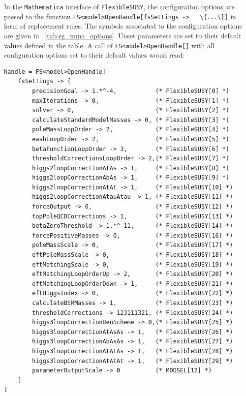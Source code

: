 \documentclass[final,3p,11pt,pdflatex]{elsarticle}
\makeatletter
\newcommand{\fs}{\texttt{FlexibleSUSY}\@\xspace}
\newcommand{\mathematica}{\texttt{Ma\-the\-ma\-ti\-ca}\xspace}
\newcommand{\code}[1]{\lstinline|#1|}  %
\newcommand{\tabref}[1]{\tablename~\ref{#1}}
\makeatother
\begin{document}
%
In the \mathematica interface of \fs, the configuration options are
passed to the function \code{FS<model>OpenHandle[fsSettings ->
  \{...\}]} in form of replacement rules.  The symbols associated to
the configuration options are given in \tabref{tab:sg_mma_options}.
Unset parameters are set to their default values defined in the table.
A call of \code{FS<model>OpenHandle[]} with all configuration options
set to their default values would read:
%
\begin{lstlisting}
handle = FS<model>OpenHandle[
    fsSettings -> {
        precisionGoal -> 1.*^-4,           (* FlexibleSUSY[0] *)
        maxIterations -> 0,                (* FlexibleSUSY[1] *)
        solver -> 0,                       (* FlexibleSUSY[2] *)
        calculateStandardModelMasses -> 0, (* FlexibleSUSY[3] *)
        poleMassLoopOrder -> 2,            (* FlexibleSUSY[4] *)
        ewsbLoopOrder -> 2,                (* FlexibleSUSY[5] *)
        betaFunctionLoopOrder -> 3,        (* FlexibleSUSY[6] *)
        thresholdCorrectionsLoopOrder -> 2,(* FlexibleSUSY[7] *)
        higgs2loopCorrectionAtAs -> 1,     (* FlexibleSUSY[8] *)
        higgs2loopCorrectionAbAs -> 1,     (* FlexibleSUSY[9] *)
        higgs2loopCorrectionAtAt -> 1,     (* FlexibleSUSY[10] *)
        higgs2loopCorrectionAtauAtau -> 1, (* FlexibleSUSY[11] *)
        forceOutput -> 0,                  (* FlexibleSUSY[12] *)
        topPoleQCDCorrections -> 1,        (* FlexibleSUSY[13] *)
        betaZeroThreshold -> 1.*^-11,      (* FlexibleSUSY[14] *)
        forcePositiveMasses -> 0,          (* FlexibleSUSY[16] *)
        poleMassScale -> 0,                (* FlexibleSUSY[17] *)
        eftPoleMassScale -> 0,             (* FlexibleSUSY[18] *)
        eftMatchingScale -> 0,             (* FlexibleSUSY[19] *)
        eftMatchingLoopOrderUp -> 2,       (* FlexibleSUSY[20] *)
        eftMatchingLoopOrderDown -> 1,     (* FlexibleSUSY[21] *)
        eftHiggsIndex -> 0,                (* FlexibleSUSY[22] *)
        calculateBSMMasses -> 1,           (* FlexibleSUSY[23] *)
        thresholdCorrections -> 123111321, (* FlexibleSUSY[24] *)
        higgs3loopCorrectionRenScheme -> 0,(* FlexibleSUSY[25] *)
        higgs3loopCorrectionAtAsAs -> 1,   (* FlexibleSUSY[26] *)
        higgs3loopCorrectionAbAsAs -> 1,   (* FlexibleSUSY[27] *)
        higgs3loopCorrectionAtAtAs -> 1,   (* FlexibleSUSY[28] *)
        higgs3loopCorrectionAtAtAt -> 1,   (* FlexibleSUSY[29] *)
        parameterOutputScale -> 0          (* MODSEL[12] *)
    }
]
\end{lstlisting}
%
\end{document}
